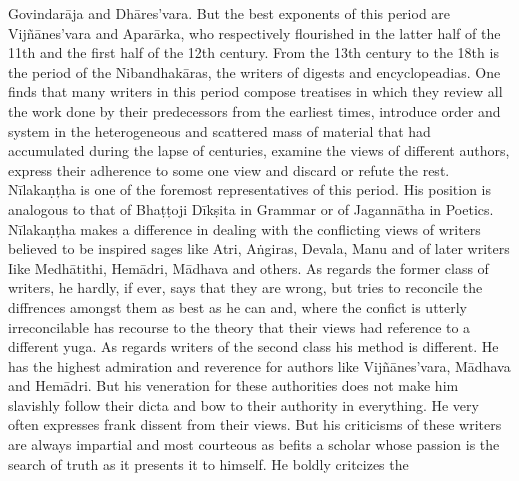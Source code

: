 \documentclass[11pt, openany]{book}
\begin{document}
\noindent
Govindarāja and Dhāres'vara. But the best exponents of this period are Vijñānes'vara and Aparārka, who respectively flourished in the latter half of the 11th and the first half of the 12th century. From the 13th century to the 18th is the period of the Nibandhakāras, the writers of digests and encyclopeadias. One finds that many writers in this period compose treatises in which they review all the work done by their predecessors from the earliest times, introduce order and system in the heterogeneous and scattered mass of material that had accumulated during the lapse of centuries, examine the views of different authors, express their adherence to some one view and discard or refute the rest. Nīlakaṇṭha is one of the foremost representatives of this period. His position is analogous to that of Bhaṭṭoji Dīkṣita in Grammar or of Jagannātha in Poetics. Nīlakaṇṭha makes a difference in dealing with the conflicting views of writers believed to be inspired sages like Atri, Aṅgiras, Devala, Manu and of later writers Iike Medhātithi, Hemādri, Mādhava and others. As regards the former class of writers, he hardly, if ever, says that they are wrong, but tries to reconcile the diffrences amongst them as best as he can and, where the confict is utterly irreconcilable has recourse to the theory that their views had reference to a different yuga. As regards writers of the second class his method is different. He has the highest admiration and reverence for authors like Vijñānes'vara, Mādhava and Hemādri. But his veneration for these authorities does not make him slavishly follow their dicta and bow to their authority in everything. He very often expresses frank dissent from their views. But his criticisms of these writers are always impartial and most courteous as befits a scholar whose passion is the search of truth as it presents it to himself. He boldly critcizes the

\newpage
\end{document}
